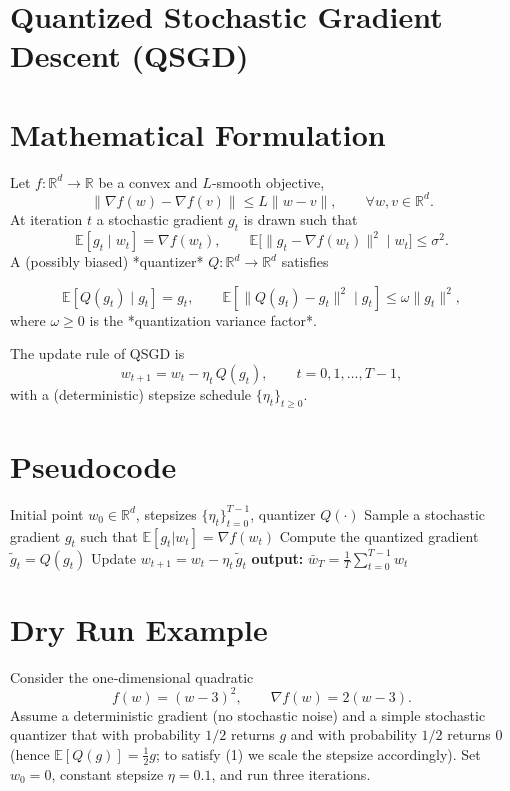 \documentclass{article}
\newcommand{\E}{\mathbb{E}}
\newcommand{\R}{\mathbb{R}}
\begin{document}
\section*{Quantized Stochastic Gradient Descent (QSGD)}

\section*{Mathematical Formulation}
Let $f:\R^{d}\rightarrow\R$ be a convex and $L$‑smooth objective,
\[
\|\nabla f(w)-\nabla f(v)\| \le L\|w-v\|,\qquad \forall w,v\in\R^{d}.
\]
At iteration $t$ a stochastic gradient $g_t$ is drawn such that  
\[
\E[g_t\mid w_t]=\nabla f(w_t), \qquad 
\E\big[\|g_t-\nabla f(w_t)\|^{2}\mid w_t\big]\le\sigma^{2}. 
\]
A (possibly biased) *quantizer* $Q:\R^{d}\rightarrow\R^{d}$ satisfies  

\[
\E\!\left[Q(g_t)\mid g_t\right]=g_t ,\qquad 
\E\!\left[\|Q(g_t)-g_t\|^{2}\mid g_t\right]\le \omega\|g_t\|^{2},
\tag{1}
\]
where $\omega\ge0$ is the *quantization variance factor*.  

The update rule of QSGD is  
\[
w_{t+1}=w_t-\eta_t\, Q(g_t),\qquad t=0,1,\dots ,T-1,
\tag{2}
\]
with a (deterministic) stepsize schedule $\{\eta_t\}_{t\ge0}$.

\section*{Pseudocode}
\begin{algorithm}[H]
\caption{Quantized Stochastic Gradient Descent}
\begin{algorithmic}[1]
\Require Initial point $w_{0}\in\R^{d}$, stepsizes $\{\eta_t\}_{t=0}^{T-1}$, quantizer $Q(\cdot)$
    \State Sample a stochastic gradient $g_t$ such that $\E[g_t|w_t]=\nabla f(w_t)$
    \State Compute the quantized gradient $\tilde g_t = Q(g_t)$
    \State Update $w_{t+1}=w_t-\eta_t\,\tilde g_t$
\EndFor
\State \textbf{output:} $\displaystyle \bar w_T=\frac{1}{T}\sum_{t=0}^{T-1}w_t$
\end{algorithmic}
\end{algorithm}

\section*{Dry Run Example}
Consider the one‑dimensional quadratic  
\[
f(w)=(w-3)^{2},\qquad \nabla f(w)=2(w-3).
\]
Assume a deterministic gradient (no stochastic noise) and a simple stochastic quantizer that with probability $1/2$ returns $g$ and with probability $1/2$ returns $0$ (hence $\E[Q(g)]=\tfrac12 g$; to satisfy (1) we scale the stepsize accordingly).  
Set $w_0=0$, constant stepsize $\eta=0.1$, and run three iterations.
\end{document}
